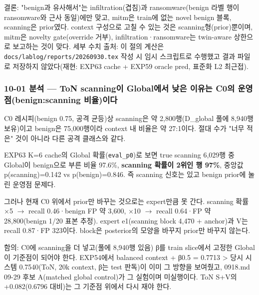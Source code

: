 \endgroup
결론: "benign과 유사해서"는 infiltration(겹침)과 ransomware(benign 라벨 행이 ransomware와 근사 동일)에만 맞고, mitm은 train에 없는 novel benign 블록, scanning은 prior였다. context 구성으로 고칠 수 있는 것은 scanning형(prior)뿐이며, mitm은 novelty gate(override 거부), infiltration·ransomware는 twin-aware 상한으로 보고하는 것이 맞다. 세부 수치 출처: 이 절의 계산은 \texttt{docs/\allowbreak{}\allowbreak{}lab\allowbreak{}log/\allowbreak{}\allowbreak{}repo\allowbreak{}rts/\allowbreak{}\allowbreak{}2026\allowbreak{}0930.\allowbreak{}tex\allowbreak{}} 작성 시 임시 스크립트로 수행했고 결과 파일로 저장하지 않았다(재현: EXP63 cache +\allowbreak{} EXP59 oracle pred, 표준화 L2 최근접).

\subsubsection{10-01 분석 — ToN scanning이 Global에서 낮은 이유는 C0의 운영점(benign:scanning 비율)이다}
\par\noindent \textbullet\enspace C0 레시피(benign 0.75, 공격 균등)상 scanning은 약 2,800행(D\_\allowbreak{}global 풀에 8,940행 보유)이고 benign은 75,000행이라 context 내 비율은 약 27:1이다. 절대 수가 "너무 적은" 것이 아니라 다른 공격 클래스와 같다.


\par\noindent \textbullet\enspace EXP63 K=\allowbreak{}6 cache의 Global 확률(\texttt{eval\_\allowbreak{}\allowbreak{}p0})로 보면 true scanning 6,029행 중 Global이 benign으로 부른 비율 97.6\%, \textbf{scanning 확률이 2위인 행 97\%}, 중앙값 p(scanning)=\allowbreak{}0.142 vs p(benign)=\allowbreak{}0.846. 즉 scanning 신호는 있고 benign prior에 눌린 운영점 문제다.


\par\noindent \textbullet\enspace 그러나 현재 C0 위에서 prior만 바꾸는 것으로는 expert만큼 못 간다. scanning 확률 ×5  \ensuremath{\rightarrow}  recall 0.46·benign FP 약 3,600, ×10  \ensuremath{\rightarrow}  recall 0.64·FP 약 28,800(benign 1/\allowbreak{}20 표본 추정). expert e1(scanning block 4,470 +\allowbreak{} anchor)과 V는 recall 0.87·FP 323이다. block은 posterior의 모양을 바꾸지 prior만 바꾸지 않는다.


\par\noindent \textbullet\enspace 함의: C0에 scanning을 더 넣고(풀에 8,940행 있음) β를 train slice에서 고정한 Global이 기준점이 되어야 한다. EXP54에서 balanced context +\allowbreak{} β0.5 =\allowbreak{} 0.7713 > 당시 시스템 0.7540(ToN, 20k context, β는 test 판독)이 이미 그 방향을 보여줬고, 0918.md 09-29 후보 A(matched global control)가 그 실험이며 미실행이다. ToN S+\allowbreak{}V의 +\allowbreak{}0.082(0.6796 대비)는 그 기준점 위에서 다시 재야 한다.


